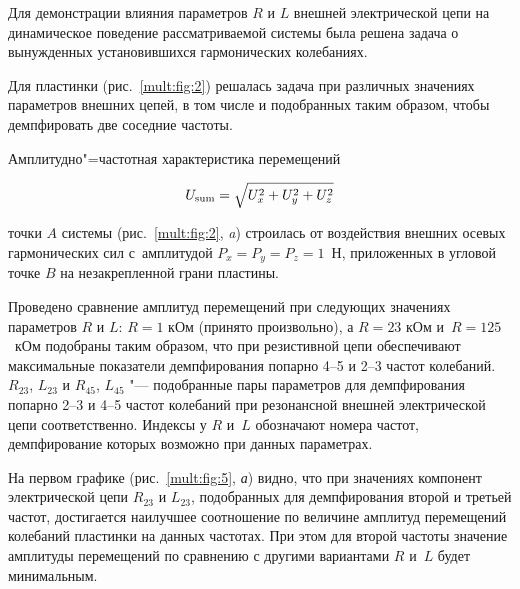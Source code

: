 
Для демонстрации влияния параметров $R$ и $L$ внешней электрической цепи на динамическое поведение рассматриваемой системы была решена задача о вынужденных установившихся гармонических колебаниях.





Для пластинки (рис.~\ref{mult:fig:2}) решалась задача при различных значениях параметров внешних цепей, в том числе и подобранных таким образом, чтобы демпфировать две соседние частоты.



Амплитудно"=частотная характеристика  перемещений 

 $$U_{\rm sum}=\sqrt{U_{x}^2+U_{y}^2+U_{z}^2}$$

точки $A$ системы (рис.~\ref{mult:fig:2}, {\sl a}\/) строилась от воздействия внешних осевых гармонических сил с~амплитудой $P_{x}=P_{y}=P_{z}=1$~Н, приложенных в угловой точке $B$ на незакрепленной грани пластины.



Проведено сравнение амплитуд перемещений при следующих значениях параметров $R$ и $L$: $R=1$ кОм (принято произвольно), а $R=23$ кОм и~${R=125}$~кОм подобраны таким образом, что при резистивной цепи обеспечивают максимальные показатели демпфирования попарно 4--5 и 2--3 частот колебаний. $R_{23}$, $L_{23}$ и $R_{45}$, $L_{45}$ "--- подобранные пары параметров для демпфирования попарно 2--3 и 4--5 частот колебаний при резонансной внешней электрической цепи соответственно. Индексы у $R$ и~$L$ обозначают номера частот, демпфирование которых возможно при данных параметрах.



На первом графике (рис.~\ref{mult:fig:5}, {\sl а}) видно, что при значениях компонент электрической цепи $R_{23}$  и  $L_{23}$, подобранных для демпфирования второй и третьей частот, достигается наилучшее соотношение по величине амплитуд перемещений колебаний пластинки на данных частотах. При этом для второй частоты значение амплитуды перемещений по сравнению с другими вариантами $R$ и~$L$ будет минимальным.







